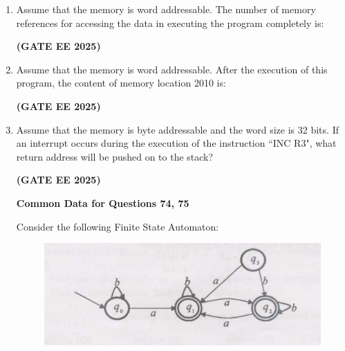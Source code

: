 \documentclass[journal,12pt,onecolumn]{IEEEtran}
\theoremstyle{remark}
\begin{document}
\begin {center}
\begin{enumerate}
    
        \item  Assume that the memory is word addressable. The number of memory references for accessing the data in executing the program completely is:
        \begin{enumerate}
        \end{enumerate}
\hfill \textbf{(GATE EE 2025)}
        \item Assume that the memory is word addressable. After the execution of this program, the content of memory location 2010 is:
        \begin{enumerate}
        \end{enumerate}
\hfill \textbf{(GATE EE 2025)}
        \item Assume that the memory is byte addressable and the word size is 32 bits. If an interrupt occurs during the execution of the instruction ``INC R3", what return address will be pushed on to the stack?
        \begin{enumerate}
        \end{enumerate}
\hfill \textbf{(GATE EE 2025)}
 
\textbf{Common Data for Questions 74, 75}

Consider the following Finite State Automaton:
\begin{figure}[h]
    \centering
    \includegraphics[width=0.5\linewidth]{figs/fig4.png}
    \caption{   }
    \label{fig4}
\end{figure}


\end{enumerate}
\end{center}
\end{document}
